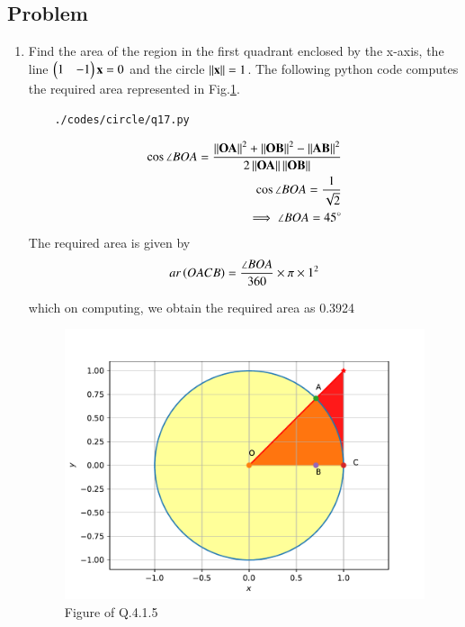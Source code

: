 \subsection{Problem}

\renewcommand{\theequation}{\theenumi}
\begin{enumerate}[label=\thesection.\arabic*.,ref=\thesection.\theenumi]
\item Find the area of the region in the first quadrant enclosed by the x-axis, the line $\begin{pmatrix}1&-1\end{pmatrix}\mathbf{x}=0$ and the circle $\left\lVert\mathbf{x}\right\rVert=1$.
The following python code computes the required area represented in Fig.\ref{fig:qseventeen}.
	\begin{lstlisting}
	./codes/circle/q17.py
	\end{lstlisting}
	
\solution
\begin{align}
\cos{\angle{BOA}} = \frac{\left\lVert\mathbf{OA}\right\rVert^2 + \left\lVert\mathbf{OB}\right\rVert^2 - \left\lVert\mathbf{AB}\right\rVert^2}{2\left\lVert\mathbf{OA}\right\rVert\left\lVert\mathbf{OB}\right\rVert}
\\
\cos{\angle{BOA}} = \frac{1}{\sqrt{2}}
\\
\implies \angle{BOA} = 45\degree
\end{align}
 The required area is given by
\begin{align}
ar\left(OACB\right) = \frac{\angle{BOA}}{360} \times \pi \times 1^2
\end{align}

which on computing, we obtain the required area as 0.3924
\begin{figure}[!ht]
	\centering
	\includegraphics[width=\columnwidth]{./figs/circle/q17.pdf}
	\caption{Figure of Q.4.1.5}
	\label{fig:qseventeen}	
	\end{figure}
	
\end{enumerate}
